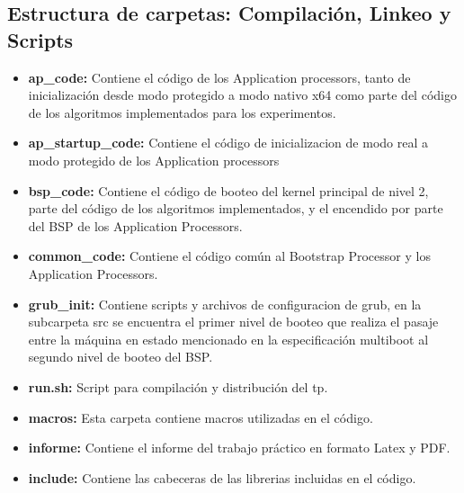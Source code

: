    \subsection{Estructura de carpetas: Compilación, Linkeo y Scripts}
    \begin{itemize}
	    \item \textbf{ap\_code: } Contiene el código de los Application processors, tanto de inicialización desde modo protegido a modo nativo x64 como parte del código de los algoritmos implementados para los experimentos.
		\item \textbf{ap\_startup\_code: } Contiene el código de inicializacion de modo real a modo protegido de los Application processors
		\item \textbf{bsp\_code: } Contiene el código de booteo del kernel principal de nivel 2, parte del código de los algoritmos implementados, y el encendido por parte del BSP de los Application Processors.
		\item \textbf{common\_code: } Contiene el código común al Bootstrap Processor y los Application Processors.
		\item \textbf{grub\_init: } Contiene scripts y archivos de configuracion de grub, en la subcarpeta src se encuentra el primer nivel de booteo que realiza el pasaje entre la máquina en estado mencionado en la especificación multiboot al segundo nivel de booteo del BSP.
		\item \textbf{run.sh: } Script para compilación y distribución del tp.
		\item \textbf{macros: } Esta carpeta contiene macros utilizadas en el código.
		\item \textbf{informe: } Contiene el informe del trabajo práctico en formato Latex y PDF.
		\item \textbf{include: } Contiene las cabeceras de las librerias incluidas en el código.
    \end{itemize}

